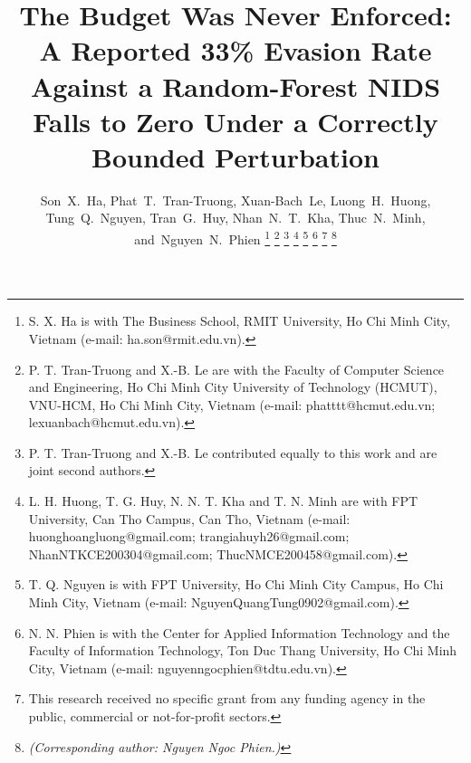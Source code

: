 \documentclass[journal]{IEEEtran}
\theoremstyle{definition}
\begin{document}
\title{The Budget Was Never Enforced: A Reported 33\% Evasion Rate Against a Random-Forest NIDS Falls to Zero Under a Correctly Bounded Perturbation}

\author{%
  Son~X.~Ha,
  Phat~T.~Tran-Truong,
  Xuan-Bach~Le,
  Luong~H.~Huong,
  Tung~Q.~Nguyen,
  Tran~G.~Huy,
  Nhan~N.~T.~Kha,
  Thuc~N.~Minh,
  and~Nguyen~N.~Phien%
  \thanks{S. X. Ha is with The Business School, RMIT University,
    Ho Chi Minh City, Vietnam (e-mail: ha.son@rmit.edu.vn).}%
  \thanks{P. T. Tran-Truong and X.-B. Le are with the Faculty of Computer
    Science and Engineering, Ho Chi Minh City University of Technology (HCMUT),
    VNU-HCM, Ho Chi Minh City, Vietnam
    (e-mail: phatttt@hcmut.edu.vn; lexuanbach@hcmut.edu.vn).}%
  \thanks{P. T. Tran-Truong and X.-B. Le contributed equally to this work
    and are joint second authors.}%
  \thanks{L. H. Huong, T. G. Huy, N. N. T. Kha and T. N. Minh are with
    FPT University, Can Tho Campus, Can Tho, Vietnam
    (e-mail: huonghoangluong@gmail.com; trangiahuyh26@gmail.com;
    NhanNTKCE200304@gmail.com; ThucNMCE200458@gmail.com).}%
  \thanks{T. Q. Nguyen is with FPT University, Ho Chi Minh City Campus,
    Ho Chi Minh City, Vietnam (e-mail: NguyenQuangTung0902@gmail.com).}%
  \thanks{N. N. Phien is with the Center for Applied Information
    Technology and the Faculty of Information Technology, Ton Duc Thang
    University, Ho Chi Minh City, Vietnam
    (e-mail: nguyenngocphien@tdtu.edu.vn).}%
  \thanks{This research received no specific grant from any funding agency in the public, commercial or not-for-profit sectors.}%
  \thanks{\emph{(Corresponding author: Nguyen Ngoc Phien.)}}%
}

\maketitle
\end{document}
